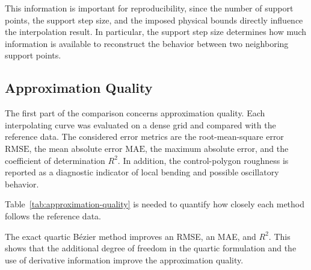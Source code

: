 \documentclass[12pt,a4paper]{article}
\begin{document}
This information is important for reproducibility, since the
number of support points, the support step size, and the imposed physical
bounds directly influence the interpolation result. In particular, the
support step size determines how much information is available to reconstruct
the behavior between two neighboring support points.

\subsection{Approximation Quality}

The first part of the comparison concerns approximation quality. Each
interpolating curve was evaluated on a dense grid and compared with the
reference data. The considered error metrics are the root-mean-square error
\(\mathrm{RMSE}\), the mean absolute error \(\mathrm{MAE}\), the maximum
absolute error, and the coefficient of determination \(R^2\). In addition,
the control-polygon roughness is reported as a diagnostic indicator of local
bending and possible oscillatory behavior.

\begin{table}[H]
\centering
\small
{}
\caption{Approximation quality and control-polygon roughness of the considered B\'ezier interpolation methods.}
\label{tab:approximation-quality}
\end{table}

Table~\ref{tab:approximation-quality} is needed to quantify how closely each
method follows the reference data.

The exact quartic B\'ezier method improves  an RMSE, an MAE, and \(R^2\). This shows that the additional degree of freedom in the quartic formulation and the use of derivative
information improve the approximation quality.
\end{document}

